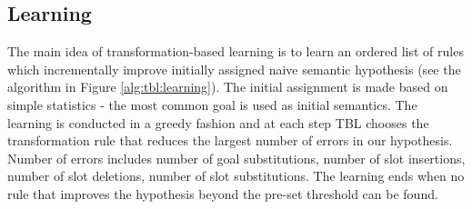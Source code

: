 \documentclass{article}
\begin{document}

\subsection{Learning} \label{sec:tbl:learning}
The main idea of transformation-based learning is to learn an ordered list of rules which incrementally improve initially assigned naive semantic hypothesis (see the algorithm in Figure \ref{alg:tbl:learning}). The initial assignment is made based on simple statistics - the most common goal is used as initial semantics. The learning is conducted in a greedy fashion and at each step TBL chooses the transformation rule that reduces the largest number of errors in our hypothesis. Number of errors includes number of goal substitutions, number of slot insertions, number of slot deletions, number of slot substitutions. The learning ends when no rule that improves the hypothesis beyond the pre-set threshold can be found.

\end{document}
